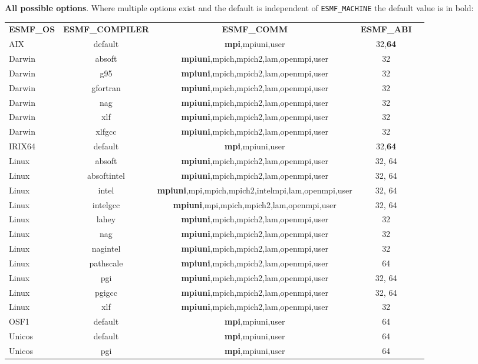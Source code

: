 \vspace{1ex}

{\bf All possible options}. Where multiple options exist 
and the default is independent of {\tt ESMF\_MACHINE} the default value is in bold:

\vspace{1ex}


\begin{tabular}{lcccc}
  {\bfseries ESMF\_OS} &{\bfseries ESMF\_COMPILER} & {\bfseries ESMF\_COMM} & {\bfseries ESMF\_ABI} \\

AIX     &  default      &  {\bf mpi},mpiuni,user         &  32,{\bf 64}  \\
Darwin  &  absoft       &  {\bf mpiuni},mpich,mpich2,lam,openmpi,user  &  32  \\
Darwin  &  g95          &  {\bf mpiuni},mpich,mpich2,lam,openmpi,user  &  32  \\
Darwin  &  gfortran     &  {\bf mpiuni},mpich,mpich2,lam,openmpi,user  &  32  \\
Darwin  &  nag          &  {\bf mpiuni},mpich,mpich2,lam,openmpi,user  &  32  \\
Darwin  &  xlf          &  {\bf mpiuni},mpich,mpich2,lam,openmpi,user  &  32  \\
Darwin  &  xlfgcc       &  {\bf mpiuni},mpich,mpich2,lam,openmpi,user  &  32  \\
IRIX64  &  default      &  {\bf mpi},mpiuni,user         &  32,{\bf 64}  \\
Linux   &  absoft       &  {\bf mpiuni},mpich,mpich2,lam,openmpi,user  &  32, 64  \\
Linux   &  absoftintel  &  {\bf mpiuni},mpich,mpich2,lam,openmpi,user  &  32, 64  \\
Linux   &  intel        &  {\bf mpiuni},mpi,mpich,mpich2,intelmpi,lam,openmpi,user  &  32, 64 \\
Linux   &  intelgcc     &  {\bf mpiuni},mpi,mpich,mpich2,lam,openmpi,user  &  32, 64 \\
Linux   &  lahey        &  {\bf mpiuni},mpich,mpich2,lam,openmpi,user  &  32  \\
Linux   &  nag          &  {\bf mpiuni},mpich,mpich2,lam,openmpi,user  &  32  \\
Linux   &  nagintel     &  {\bf mpiuni},mpich,mpich2,lam,openmpi,user  &  32  \\
Linux   &  pathscale    &  {\bf mpiuni},mpich,mpich2,lam,openmpi,user  &  64  \\
Linux   &  pgi          &  {\bf mpiuni},mpich,mpich2,lam,openmpi,user  &  32, 64  \\
Linux   &  pgigcc       &  {\bf mpiuni},mpich,mpich2,lam,openmpi,user  &  32, 64  \\
Linux   &  xlf          &  {\bf mpiuni},mpich,mpich2,lam,openmpi,user  &  32  \\
OSF1    &  default      &  {\bf mpi},mpiuni,user         &  64  \\
Unicos  &  default      &  {\bf mpi},mpiuni,user         &  64  \\
Unicos  &  pgi          &  {\bf mpi},mpiuni,user         &  64

\end{tabular}

\vspace{1ex}

